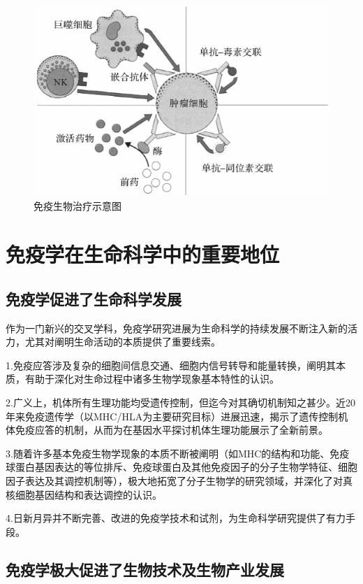 \begin{figure}[!htbp]
 \centering
 \includegraphics[scale=1.2]{./images/Image00023.jpg}
 \caption{免疫生物治疗示意图}
 \label{fig1-16}
  \end{figure} 

\section{免疫学在生命科学中的重要地位}


\subsection{免疫学促进了生命科学发展}

作为一门新兴的交叉学科，免疫学研究进展为生命科学的持续发展不断注入新的活力，尤其对阐明生命活动的本质提供了重要线索。

1.免疫应答涉及复杂的细胞间信息交通、细胞内信号转导和能量转换，阐明其本质，有助于深化对生命过程中诸多生物学现象基本特性的认识。

2.广义上，机体所有生理功能均受遗传控制，但迄今对其确切机制知之甚少。近20年来免疫遗传学（以MHC/HLA为主要研究目标）进展迅速，揭示了遗传控制机体免疫应答的机制，从而为在基因水平探讨机体生理功能展示了全新前景。

3.随着许多基本免疫生物学现象的本质不断被阐明（如MHC的结构和功能、免疫球蛋白基因表达的等位排斥、免疫球蛋白及其他免疫因子的分子生物学特征、细胞因子表达及其调控机制等），极大地拓宽了分子生物学的研究领域，并深化了对真核细胞基因结构和表达调控的认识。

4.日新月异并不断完善、改进的免疫学技术和试剂，为生命科学研究提供了有力手段。


\subsection{免疫学极大促进了生物技术及生物产业发展}

